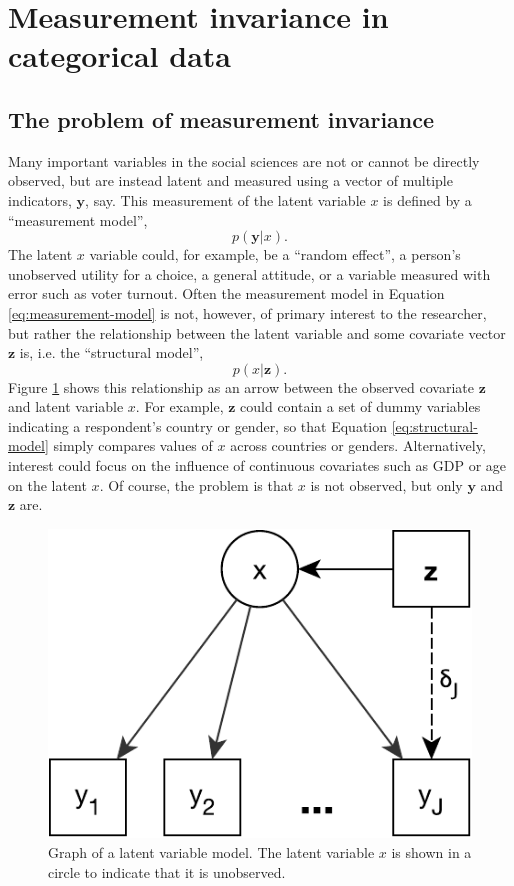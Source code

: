 
\section{Measurement invariance in categorical data}
\label{sec:invariance}
\subsection{The problem of measurement invariance}

Many important variables in the social sciences are not or cannot be directly observed, but are instead latent  \citep{bollen2002latent} and measured using a vector of multiple indicators, $\mathbf{y}$, say. This measurement of the latent variable $x$ is defined by a ``measurement model'',
\begin{equation}
	p(\mathbf{y} | x).
		\label{eq:measurement-model}
\end{equation}
The latent $x$ variable could, for example, be a ``random effect'', a person's unobserved utility for a choice, a general attitude, or a variable measured with error such as voter turnout.
Often the measurement model in Equation \ref{eq:measurement-model} is not, however, of primary interest to the researcher, but rather  the relationship between the latent variable and some covariate vector $\mathbf{z}$ is, i.e. the ``structural model'',
\begin{equation} 
	p(x | \mathbf{z}).
		\label{eq:structural-model}
\end{equation}
Figure \ref{fig:LVM} shows this relationship as an arrow between the observed covariate $\mathbf{z}$ and latent variable $x$.
For example, $\mathbf{z}$ could contain a set of dummy variables indicating a respondent's country or gender, so that Equation \ref{eq:structural-model} simply compares values of $x$ across countries or genders. Alternatively, interest could focus on the influence of continuous covariates such as GDP or age on the latent $x$. Of course, the problem is that $x$ is not observed, but only $\mathbf{y}$ and $\mathbf{z}$ are. 

\begin{figure}\centering
	\includegraphics[width=.4\textwidth]{figures/LVM}
	\caption{Graph of a latent variable model. The latent variable $x$ is shown in a circle to indicate that it is unobserved. }
	\label{fig:LVM}
\end{figure}

